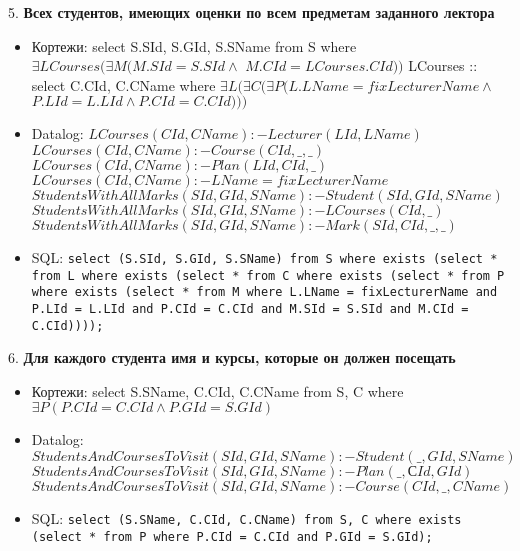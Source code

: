 \documentclass[11pt,a4paper,oneside]{article}
\begin{document}
5. \textbf{Всех студентов, имеющих оценки по всем предметам заданного лектора}
\begin{itemize}
\item Кортежи: select S.SId, S.GId, S.SName from S where $\exists LCourses (\exists M (M.SId = S.SId \land$ $M.CId = LCourses.CId))$
LCourses :: select C.CId, C.CName where $\exists L (\exists C (\exists P (L.LName = fixLecturerName \land$ $P.LId = L.LId \land P.CId = C.CId)))$
\item Datalog: 
$LCourses(CId, CName) :- Lecturer(LId, LName)$
\newline
$LCourses(CId, CName) :- Course(CId, \_, \_)$
\newline
$LCourses(CId, CName) :- Plan(LId, CId, \_)$
\newline
$LCourses(CId, CName) :- LName = fixLecturerName$
\newline
$StudentsWithAllMarks(SId, GId, SName) :- Student(SId, GId, SName)$
\newline
$StudentsWithAllMarks(SId, GId, SName) :- LCourses(CId, \_)$
\newline
$StudentsWithAllMarks(SId, GId, SName) :- Mark(SId, CId, \_, \_)$

\item SQL: \texttt{select (S.SId, S.GId, S.SName) from S where exists (select * from L where exists (select * from C where exists (select * from P where exists (select * from M where L.LName = fixLecturerName and P.LId = L.LId and P.CId = C.CId and M.SId = S.SId and M.CId = C.CId))));}
\end{itemize}

6. \textbf{Для каждого студента имя и курсы, которые он должен посещать}
\begin{itemize}
\item Кортежи: select S.SName, C.CId, C.CName from S, C where $\exists P (P.CId = C.CId \land P.GId = S.GId)$
\item Datalog: 
$StudentsAndCoursesToVisit(SId, GId, SName) :- Student(\_, GId, SName)$
\newline
$StudentsAndCoursesToVisit(SId, GId, SName) :- Plan(\_, СId, GId)$
\newline
$StudentsAndCoursesToVisit(SId, GId, SName) :- Course(CId, \_, CName)$

\item SQL: \texttt{select (S.SName, C.CId, C.CName) from S, C where exists (select * from P where P.CId = C.CId and P.GId = S.GId);}
\end{itemize}
\end{document}
